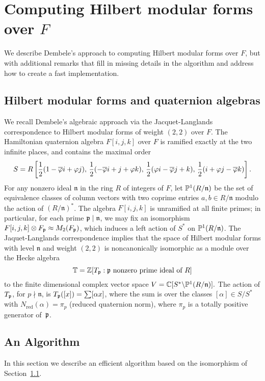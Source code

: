 \documentclass{amsart}
\newcommand{\n}{\mathfrak{n}}
\begin{document}
\section{Computing Hilbert modular forms over $F$}\label{sec:hmf}

We describe Dembele's approach to computing Hilbert modular forms over
$F$, but with additional remarks that fill in missing details in the
algorithm and address how to create a fast implementation.

\subsection{Hilbert modular forms and quaternion 
algebras}\label{sec:dembele}
We recall Dembele's algebraic approach
\cite{dembele:hilbert5} via the Jacquet-Langlands correspondence to
Hilbert modular forms of weight $(2,2)$ over $F$.
The Hamiltonian quaternion algebra $F[i,j,k]$ over $F$ is ramified
exactly at the two infinite places, and contains the maximal order
$$
 S = R\left[\frac{1}{2}(1-\overline{\varphi} i + \varphi j),\,
       \frac{1}{2}(-\overline{\varphi} i + j + \varphi k),\,
       \frac{1}{2}(\varphi i - \overline{\varphi} j + k), \,
       \frac{1}{2}(i + \varphi j - \overline{\varphi} k)\right].
$$
For any nonzero ideal $\n$ in the ring $R$ of integers of $F$,
let $\P^1(R/\n)$ be the set of equivalence classes of column vectors
with two coprime entries $a,b \in R/\n$ modulo the action of $(R/\n)^*$.
The algebra $F[i,j,k]$ is unramified at all finite primes; in
particular, for each prime $\p\mid \n$, we may fix an isomorphism
$F[i,j,k]\otimes F_{\mathfrak{p}} \approx M_2(F_{\mathfrak{p}})$, which induces a left
action of $S^*$ on $\P^1(R/\n)$.
The Jaquet-Langlands correspondence implies that
the space of Hilbert modular forms with level 
$\n$ and weight $(2,2)$ is
noncanonically isomorphic as a module over the Hecke algebra
$$\mathbb{T}=\mathbb{Z}[T_{\mathfrak{p}} :  \mathfrak{p} \text{ nonzero prime ideal of }R]$$ 
to the finite dimensional complex vector space $ V = \C[S^* \backslash
\P^1(R/\n)].  $ The action of $T_{\mathfrak{p}}$, for $p\nmid \n$, is
$T_{\mathfrak{p}}([x]) = \sum [\alpha x]$, where the sum is over the classes
$[\alpha]\in S/S^*$ with $N_{\text{red}}(\alpha)=\pi_p$ (reduced quaternion norm),
where $\pi_p$ is a totally positive generator of~$\mathfrak{p}$.

\subsection{An Algorithm}

In this section we describe an efficient algorithm based on
the isomorphism of Section~\ref{sec:dembele}.
\end{document}

